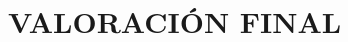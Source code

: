 \documentclass[./main.tex]{subfiles}
\begin{document}
\setcounter{chapter}{3}



%

%

%

%

%


\chapter{VALORACIÓN FINAL}


\end{document}
